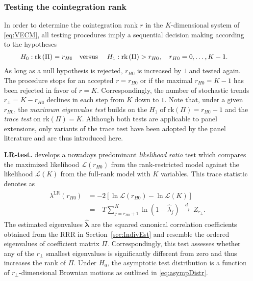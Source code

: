 \subsubsection{Testing the cointegration rank} \label{sec:IndivTest}
In order to determine the cointegration rank $ r $ in the $ K $-dimensional system of \eqref{eq:VECM}, all testing procedures imply a sequential decision making according to the hypotheses 
\begin{align} \label{eq:RankHypo}
\begin{split}
	H_0: \text{rk}\left( \Pi \right) = r_{H0} & \text{\quad versus \quad} H_1: \text{rk} \left( \Pi \right) > r_{H0}, \quad r_{H0}=0, \ldots, K-1.
\end{split}
\end{align}
As long as a null hypothesis is rejected, $r_{H0}$ is increased by $1$ and tested again. The procedure stops for an accepted $ r = r_{H0} $ or if the maximal $r_{H0} = K - 1$ has been rejected in favor of $ r = K $. Correspondingly, the number of stochastic trends $ r_\perp = K - r_{H0} $ declines in each step from $K$ down to $1$. Note that, under a given $r_{H0}$, the \textit{maximum eigenvalue test} builds on the $ H_ 1 $ of $ \text{rk}(\Pi) = r_{H0} + 1 $ and the \textit{trace test} on $ \text{rk}(\Pi) = K $. Although both tests are applicable to panel extensions, only variants of the trace test have been adopted by the panel literature and are thus introduced here.


\textbf{LR-test.} \citet{Johansen1988} develops a nowadays predominant \textit{likelihood ratio} test which compares the maximized likelihood $ \mathcal{L}(r_{H0}) $ from the rank-restricted model against the likelihood $ \mathcal{L}(K) $ from the full-rank model with $ K $ variables. This trace statistic denotes as
\begin{align} \label{eq:LRrank}
\begin{split}
	\lambda^{\text{LR}} \left( r_{H0} \right) & = -2 \left[ \ln \mathcal{L}(r_{H0}) - \ln \mathcal{L}(K) \right] \\
	& = -T \sum_{j=r_{H0}+1}^{K} \ln(1-\hat{\lambda}_j) \ \overset{d}{\longrightarrow} \ Z_{r_\perp}. 
\end{split}
\end{align}
The estimated eigenvalues $ \boldsymbol{\hat{\lambda}} $ are the squared canonical correlation coefficients obtained from the RRR in Section~\ref{sec:IndivEst} and resemble the ordered eigenvalues of coefficient matrix $ \Pi $. Correspondingly, this test assesses whether any of the $ r_\perp $ smallest eigenvalues is significantly different from zero and thus increases the rank of $ \Pi $. Under $ H_0 $, the asymptotic test distribution is a function of $ r_\perp $-dimensional Brownian motions as outlined in \eqref{eq:asympDistr}.


